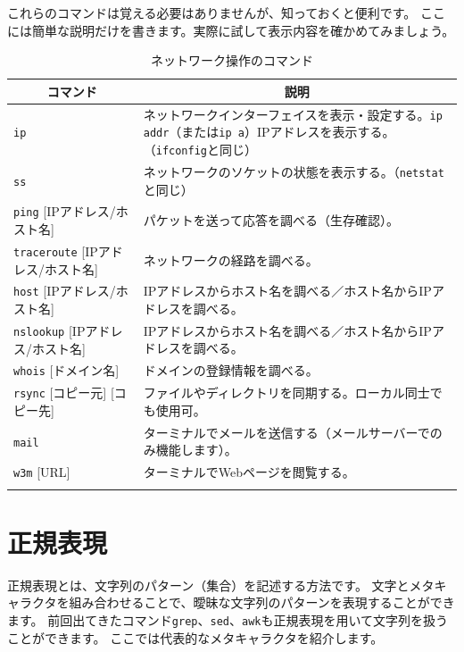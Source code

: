 \documentclass[a4j]{ltjreport}
\begin{document}
    \newpage
    これらのコマンドは覚える必要はありませんが、知っておくと便利です。
    ここには簡単な説明だけを書きます。実際に試して表示内容を確かめてみましょう。
    \begin{longtable}[c]{|p{3.5cm}|p{13.5cm}|}
        \hline
        \multicolumn{1}{|c|}{\textbf{コマンド}}&\multicolumn{1}{|c|}{\textbf{説明}}\\
        \hline\hline
        \texttt{ip}&ネットワークインターフェイスを表示・設定する。\texttt{ip addr}（または\texttt{ip a}）IPアドレスを表示する。（\texttt{ifconfig}と同じ）\\
        \hline
        \texttt{ss}&ネットワークのソケットの状態を表示する。（\texttt{netstat}と同じ）\\
        \hline
        \texttt{ping} [IPアドレス/ホスト名] &パケットを送って応答を調べる（生存確認）。\\
        \hline
        \texttt{traceroute} [IPアドレス/ホスト名] &ネットワークの経路を調べる。\\
        \hline
        \texttt{host} [IPアドレス/ホスト名] &IPアドレスからホスト名を調べる／ホスト名からIPアドレスを調べる。\\
        \hline
        \texttt{nslookup} [IPアドレス/ホスト名] &IPアドレスからホスト名を調べる／ホスト名からIPアドレスを調べる。\\
        \hline
        \texttt{whois} [ドメイン名] &ドメインの登録情報を調べる。\\
        \hline
        \texttt{rsync} [コピー元] [コピー先] &ファイルやディレクトリを同期する。ローカル同士でも使用可。\\
        \hline
        \texttt{mail} & ターミナルでメールを送信する（メールサーバーでのみ機能します）。\\
        \hline
        \texttt{w3m} [URL] &ターミナルでWebページを閲覧する。\\
        \hline
        \caption{ネットワーク操作のコマンド}
    \end{longtable}
    


    \section{正規表現}
    正規表現とは、文字列のパターン（集合）を記述する方法です。
    文字とメタキャラクタを組み合わせることで、曖昧な文字列のパターンを表現することができます。
    前回出てきたコマンド\texttt{grep}、\texttt{sed}、\texttt{awk}も正規表現を用いて文字列を扱うことができます。
    ここでは代表的なメタキャラクタを紹介します。
\end{document}
